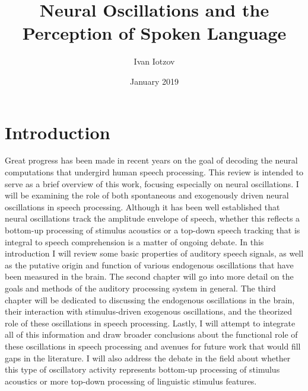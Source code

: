 \documentclass[titlepage]{article}
\title{Neural Oscillations and the \\ Perception of Spoken Language}
\author{Ivan Iotzov}
\date{January 2019}
\begin{document}

\maketitle


\section{Introduction} \label{intro}

  Great progress has been made in recent years on the goal
  of decoding the neural computations that undergird 
  human speech processing. This review is intended
  to serve as a brief overview of this work, focusing especially on 
  neural oscillations. I will be examining the role of
  both spontaneous and exogenously driven neural oscillations 
  in speech processing. Although it has been well established that 
  neural oscillations track the amplitude envelope of speech, whether this 
  reflects a bottom-up processing of stimulus acoustics or a top-down 
  speech tracking that is integral to speech comprehension is a matter 
  of ongoing debate. In this introduction I will review
  some basic properties of auditory speech signals, as well as the putative 
  origin and function of various endogenous oscillations that have been 
  measured in the brain. The second 
  chapter will go into more detail on the goals and methods of the auditory 
  processing system in general. The third chapter will be dedicated to 
  discussing the endogenous oscillations in the brain, their interaction with 
  stimulus-driven exogenous oscillations, and the theorized role of these 
  oscillations in speech processing. Lastly, I will attempt
  to integrate all of this information and draw broader conclusions about 
  the functional role of these oscillations in speech processing and avenues 
  for future work that would fill gaps in the literature. I will also address
  the debate in the field about whether this type of oscillatory activity 
  represents bottom-up processing of stimulus acoustics or more top-down 
  processing of linguistic stimulus features. 

\end{document}
